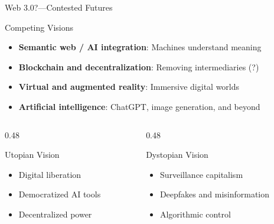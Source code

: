 \documentclass[aspectratio=169,11pt]{beamer}
\begin{document}
\begin{frame}{Web 3.0?---Contested Futures}
\begin{block}{Competing Visions}
\begin{itemize}
  \item \textbf{Semantic web / AI integration}: Machines understand meaning
  \item \textbf{Blockchain and decentralization}: Removing intermediaries (?)
  \item \textbf{Virtual and augmented reality}: Immersive digital worlds
  \item \textbf{Artificial intelligence}: ChatGPT, image generation, and beyond
\end{itemize}
\end{block}

\vspace{0.3em}
\begin{columns}
\begin{column}{0.48\textwidth}
\begin{exampleblock}{Utopian Vision}
\begin{itemize}
  \item Digital liberation
  \item Democratized AI tools
  \item Decentralized power
\end{itemize}
\end{exampleblock}
\end{column}

\begin{column}{0.48\textwidth}
\begin{alertblock}{Dystopian Vision}
\begin{itemize}
  \item Surveillance capitalism
  \item Deepfakes and misinformation
  \item Algorithmic control
\end{itemize}
\end{alertblock}
\end{column}
\end{columns}

\vspace{0.3em}
\end{frame}
\end{document}
